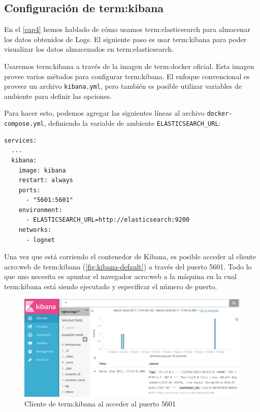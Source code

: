 \subsection{Configuración de \gls{term:kibana}}
\label{configuracion-de-kibana}

En el \autoref{cap4} hemos hablado de cómo usamos \gls{term:elasticsearch} para
almacenar los datos obtenidos de Logs. El siguiente paso es usar
\gls{term:kibana} para poder visualizar los datos almacenados en
\gls{term:elasticsearch}.

Usaremos \gls{term:kibana} a través de la imagen de \gls{term:docker} oficial.
Esta imagen provee varios métodos para configurar \gls{term:kibana}. El enfoque
convencional es proveer un archivo \lstinline{kibana.yml}, pero también es
posible utilizar variables de ambiente para definir las opciones.

Para hacer esto, podemos agregar las siguientes líneas al archivo
\texttt{docker-compose.yml}, definiendo la variable de ambiente
\lstinline{ELASTICSEARCH_URL}:

\begin{lstlisting}
services:
  ...
  kibana:
    image: kibana
    restart: always
    ports:
      - "5601:5601"
    environment:
      - ELASTICSEARCH_URL=http://elasticsearch:9200
    networks:
      - lognet
\end{lstlisting}

Una vez que está corriendo el contenedor de Kibana, es posible acceder al
cliente \gls{acro:web} de \gls{term:kibana} (\autoref{fig:kibana-default}) a
través del puerto 5601. Todo lo que uno necesita es apuntar el navegador
\gls{acro:web} a la máquina en la cual \gls{term:kibana} está siendo ejecutado y especificar el número de puerto.

\begin{figure}
  \includegraphics[width=\linewidth]{src/images/05-capitulo-5/kibanadefault.jpg}
  \caption{Cliente de \gls{term:kibana} al acceder al puerto 5601}
  \label{fig:kibana-default}
\end{figure}

